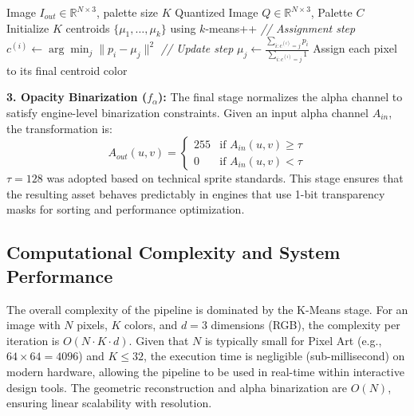 \documentclass[runningheads]{llncs}
\begin{document}
\begin{algorithm}[ht]
\small
\caption{K-Means Color Quantization for Pixel Art}
\label{alg:kmeans}
\begin{algorithmic}[1]
\REQUIRE Image $I_{out} \in \mathbb{R}^{N \times 3}$, palette size $K$
\ENSURE Quantized Image $Q \in \mathbb{R}^{N \times 3}$, Palette $C$
\STATE Initialize $K$ centroids $\{\mu_1, \dots, \mu_k\}$ using $k$-means++
\REPEAT
    \STATE \textit{// Assignment step}
        \STATE $c^{(i)} \leftarrow \arg\min_{j} \| p_i - \mu_j \|^2$
    \ENDFOR
    \STATE \textit{// Update step}
        \STATE $\mu_j \leftarrow \frac{\sum_{i: c^{(i)}=j} p_i}{\sum_{i: c^{(i)}=j} 1}$
    \ENDFOR
{}
\STATE Assign each pixel to its final centroid color
\end{algorithmic}
\end{algorithm}

\textbf{3. Opacity Binarization ($f_{\alpha}$):}
The final stage normalizes the alpha channel to satisfy engine-level binarization constraints. Given an input alpha channel $A_{in}$, the transformation is:
\begin{equation}
A_{out}(u,v) =
\begin{cases}
255 & \text{if } A_{in}(u,v) \geq \tau \\
0 & \text{if } A_{in}(u,v) < \tau
\end{cases}
\end{equation}
$\tau = 128$ was adopted based on technical sprite standards. This stage ensures that the resulting asset behaves predictably in engines that use 1-bit transparency masks for sorting and performance optimization.

\subsection{Computational Complexity and System Performance}

The overall complexity of the pipeline is dominated by the K-Means stage. For an image with $N$ pixels, $K$ colors, and $d=3$ dimensions (RGB), the complexity per iteration is $O(N \cdot K \cdot d)$. Given that $N$ is typically small for Pixel Art (e.g., $64 \times 64 = 4096$) and $K \leq 32$, the execution time is negligible (sub-millisecond) on modern hardware, allowing the pipeline to be used in real-time within interactive design tools. The geometric reconstruction and alpha binarization are $O(N)$, ensuring linear scalability with resolution.
\end{document}
